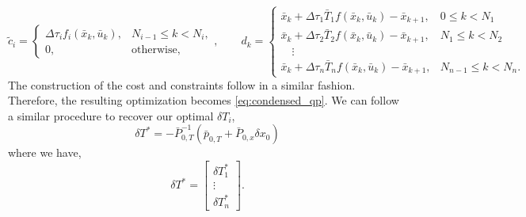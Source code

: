 \documentclass{article}
\begin{document}
\begin{equation}
    \tilde c_i = \begin{cases}
        \Delta \tau_i f_i(\bar x_k, \bar u_k), & N_{i - 1} \leq k < N_i, \\
        0, & \text{otherwise},
    \end{cases},
    \qquad
    d_k = \begin{cases}
        \bar{x}_k + \Delta \tau_1 \bar{T}_1 f(\bar{x}_k, \bar{u}_k) - \bar{x}_{k+1}, & 0 \leq k < N_1 \\
        \bar{x}_k + \Delta \tau_2 \bar{T}_2 f(\bar{x}_k, \bar{u}_k) - \bar{x}_{k+1}, & N_1 \leq k < N_2 \\
        \quad \vdots \\
        \bar{x}_k + \Delta \tau_n \bar{T}_n f(\bar{x}_k, \bar{u}_k) - \bar{x}_{k+1}, & N_{n - 1} \leq k < N_n.
    \end{cases}
\end{equation}
The construction of the cost and constraints follow in a similar fashion. Therefore, the resulting optimization becomes \eqref{eq:condensed_qp}. We can follow a similar procedure to recover our optimal $\delta T_i$,
\begin{equation}
    \delta T^* = - \bar P_{0, T}^{-1}\left(\bar p_{0,T} +  \bar P_{0,x} \delta x_0\right)
\end{equation}
where we have,
\begin{equation}
    \delta T^* = \begin{bmatrix}
        \delta T^*_1 \\
        \vdots \\
        \delta T^*_n
    \end{bmatrix}.
\end{equation}
\end{document}
